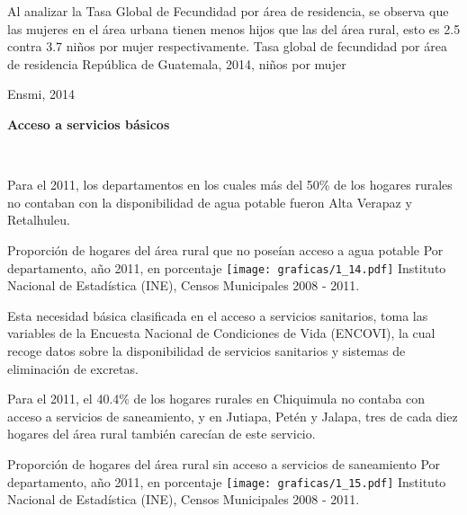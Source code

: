 
%
{%
	Al analizar la Tasa Global de Fecundidad por área de residencia, se observa que las mujeres en el área urbana tienen menos hijos que las del área rural, esto es 2.5 contra 3.7 niños por mujer respectivamente. 
}%
{%
	Tasa global de fecundidad por área de residencia} %
{%
	República de Guatemala, 2014, niños por mujer} %
{%
	\begin{tikzpicture}[x=1pt,y=1pt]    \end{tikzpicture}}%
{%
	Ensmi, 2014} %




\newpage
{}
\begin{center}
\textbf{\color{color2}\LARGE \thesection} \quad  \textbf{\LARGE Acceso a servicios básicos} 
\end{center}
$\ $ \\[-2.3cm]
%
{%
	
	Para el 2011, los departamentos en los cuales más del 50\% de los hogares rurales no contaban con la disponibilidad de agua potable fueron Alta Verapaz y Retalhuleu.}%
{%
	Proporción de hogares del área rural que no poseían acceso a agua potable
} %
{%
	Por departamento, año 2011, en porcentaje} %
{%
	\texttt{[image: graficas/1\_14.pdf]}}%
{%
	Instituto Nacional de Estadística (INE), Censos Municipales 2008 - 2011.} %





%
{%
	Esta necesidad básica clasificada en el acceso a servicios sanitarios, toma las variables de la Encuesta Nacional de Condiciones de Vida (ENCOVI), la cual  recoge datos sobre la disponibilidad de servicios sanitarios y sistemas de eliminación de excretas.
	
	Para el 2011, el 40.4\% de los hogares rurales en Chiquimula no contaba con acceso a servicios de saneamiento, y en Jutiapa, Petén y Jalapa, tres de cada diez hogares del área rural también carecían de este servicio.   }%
{%
	Proporción de hogares del área rural sin acceso a servicios de saneamiento }
{%
	Por departamento, año 2011, en porcentaje} %
{%
	\texttt{[image: graficas/1\_15.pdf]}}%
{%
	Instituto Nacional de Estadística (INE), Censos Municipales 2008 - 2011. } %



